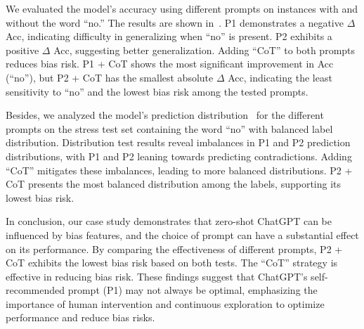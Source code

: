 We evaluated the model's accuracy using different prompts on instances 
with and without the word ``no.'' The results are shown in~. 
P1 demonstrates a negative $\Delta$ Acc, 
indicating difficulty in generalizing when ``no'' is present. 
P2 exhibits a positive $\Delta$ Acc, suggesting better generalization. 
Adding ``CoT'' to both prompts reduces bias risk. 
P1 + CoT shows the most significant improvement in 
Acc (``no''), but P2 + CoT has the smallest absolute 
$\Delta$ Acc, indicating the least sensitivity to ``no'' 
and the lowest bias risk among the tested prompts.

Besides, we analyzed the model's prediction distribution~ 
for the different prompts on the stress test set 
containing the word ``no'' with balanced label distribution. 
Distribution test results reveal imbalances in P1 and P2 
prediction distributions, with P1 and P2 leaning towards 
predicting contradictions. Adding ``CoT'' mitigates these imbalances, 
leading to more balanced distributions. 
P2 + CoT presents the most balanced distribution 
among the labels, supporting its lowest bias risk.

In conclusion, 
our case study demonstrates that zero-shot 
ChatGPT can be influenced by bias features, and the 
choice of prompt can have a substantial effect on its performance.
By comparing the effectiveness of different prompts, 
P2 + CoT exhibits the lowest bias risk based on both tests. 
The ``CoT'' strategy is effective in reducing bias risk. 
These findings suggest that ChatGPT's self-recommended prompt 
(P1) may not always be optimal, emphasizing the importance of 
human intervention and continuous exploration to optimize performance and reduce bias risks.
